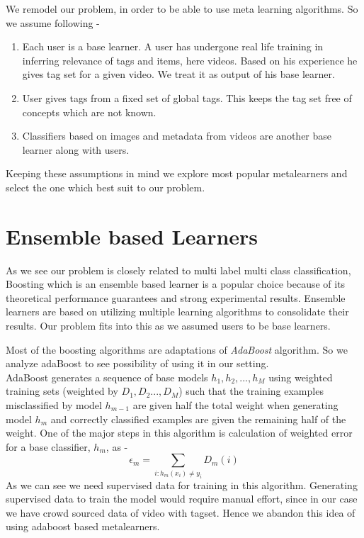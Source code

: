 \documentclass[12pt]{report}
\begin{document}
We remodel our problem, in order to be able to use meta learning algorithms. So we assume following -
\begin{enumerate}
\item Each user is a base learner. A user has undergone real life training in inferring relevance of tags and items, here videos. Based on his experience he gives tag set for a given video. We treat it as output of his base learner.
\item User gives tags from a fixed set of global tags. This keeps the tag set free of concepts which are not known.
\item Classifiers based on images and metadata from videos are another base learner along with users.
\end{enumerate}

Keeping these assumptions in mind we explore most popular metalearners and select the one which best suit to our problem.

\section{Ensemble based Learners}
As we see our problem is closely related to multi label multi class classification, Boosting which is an ensemble based learner is a popular choice because of its theoretical performance guarantees and strong experimental results. Ensemble learners are based on utilizing multiple learning algorithms to consolidate their results. Our problem fits into this as we assumed users to be base learners.

Most of the boosting algorithms are adaptations of \emph{AdaBoost}\cite{AdaBoost} algorithm. So we analyze adaBoost to see possibility of using it in our setting.
\vspace{1em}\\
AdaBoost\cite{OnlineAdaBoost} generates a sequence of base models $h_1, h_2,...,h_M$ using weighted training sets (weighted by $D_1, D_2...,D_M$) such that the training examples misclassified by model $h_{m-1}$ are given half the total weight when generating model $h_m$ and correctly classified examples are given the remaining half of the weight. One of the major steps in this algorithm is calculation of weighted error for a base classifier, $h_m$, as - 
\begin{equation}
\epsilon_m = \sum_{i:h_m(x_i) \neq y_i}D_m(i)
\end{equation}
As we can see we need supervised data for training in this algorithm. Generating supervised data to train the model would require manual effort, since in our case we have crowd sourced data of video with tagset. Hence we abandon this idea of using adaboost based metalearners. 
\end{document}
